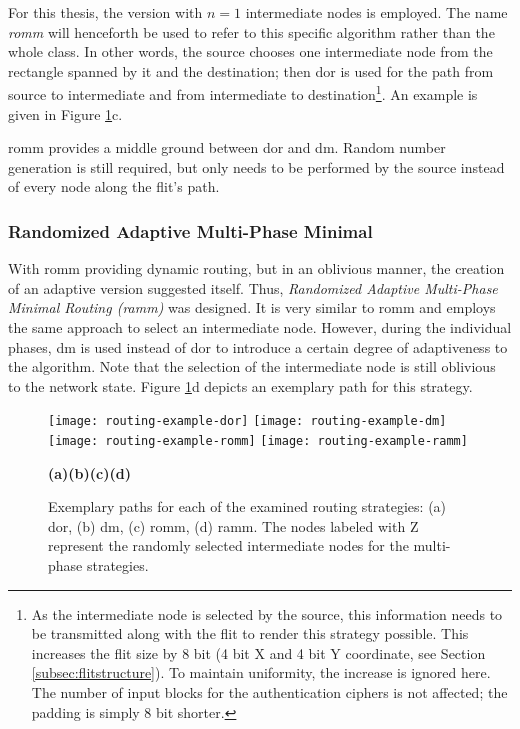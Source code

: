 For this thesis, the version with $n = 1$ intermediate nodes is employed. The name \textit{\gls{romm}} will henceforth be used to refer to this
specific algorithm rather than the whole class. In other words, the source chooses one intermediate node from the rectangle spanned by it and
the destination; then \gls{dor} is used for the path from source to intermediate and from intermediate to destination\footnote{As the intermediate
node is selected by the source, this information needs to be transmitted along with the flit to render this strategy possible. This increases the flit
size by 8 bit (4 bit X and 4 bit Y coordinate, see Section \ref{subsec:flitstructure}). To maintain uniformity, the increase is ignored here. The
number of input blocks for the authentication ciphers is not affected; the padding is simply 8 bit shorter.}. An example is given in Figure
\ref{fig:allstrategiespaths}c.

\Gls{romm} provides a middle ground between \gls{dor} and \gls{dm}. Random number generation is still required, but only needs to be performed by the
source instead of every node along the flit's path.

\subsubsection{Randomized Adaptive Multi-Phase Minimal}\label{subsubsec:ramm}
With \gls{romm} providing dynamic routing, but in an oblivious manner, the creation of an adaptive version suggested itself. Thus, \textit{Randomized
Adaptive Multi-Phase Minimal Routing (\gls{ramm})} was designed. It is very similar to \gls{romm} and employs the same approach to select an
intermediate node. However, during the individual phases, \gls{dm} is used instead of \gls{dor} to introduce a certain degree of adaptiveness to the
algorithm. Note that the selection of the intermediate node is still oblivious to the network state. Figure \ref{fig:allstrategiespaths}d depicts an
exemplary path for this strategy.

\begin{figure}
    \texttt{[image: routing-example-dor]}\hfill
    \texttt{[image: routing-example-dm]}\hfill
    \texttt{[image: routing-example-romm]}\hfill
    \texttt{[image: routing-example-ramm]}\\
    \vspace{0.5\baselineskip}
    \begin{footnotesize}
        \hspace*{0.08\textwidth}\textbf{(a)}\hfill\textbf{(b)}\hfill\textbf{(c)}\hfill\textbf{(d)}\hspace*{0.08\textwidth}
    \end{footnotesize}
    \caption[Exemplary paths for the examined routing strategies]{Exemplary paths for each of the examined routing strategies: (a) \gls{dor}, (b)
    \gls{dm}, (c) \gls{romm}, (d) \gls{ramm}. The nodes labeled with Z represent the randomly selected intermediate nodes for the multi-phase
    strategies.}
    \label{fig:allstrategiespaths}
\end{figure}

